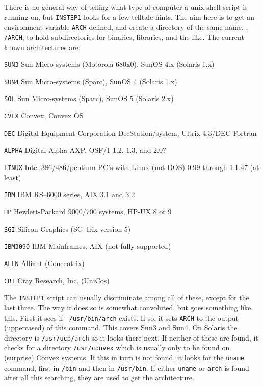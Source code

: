 \medskip{}

There is no general way of telling what type of computer a unix shell
script is running on, but {\tt INSTEP1} looks for a few telltale
hints.  The aim here is to get an environment variable {\tt ARCH}
defined, and create a directory of the same name, \ie, {\tt
\thisver/\dol ARCH}, to hold subdirectories for binaries, libraries, and
the like.  The current known architectures are:
\medskip %

{\parindent=2.5cm
\item{\tt SUN3\quad}    Sun Micro-systems (Motorola 680x0), SunOS 4.x
                        (Solaris 1.x)
\item{\tt SUN4\quad}    Sun Micro-systems (Sparc), SunOS 4 (Solaris 1.x)
\item{\tt SOL\quad}     Sun Micro-systems (Sparc), SunOS 5 (Solaris 2.x)
\item{\tt CVEX\quad}    Convex, Convex OS
\item{\tt DEC\quad}     Digital Equipment Corporation DecStation/system,
                        Ultrix 4.3/DEC Fortran
\item{\tt ALPHA\quad}   Digital Alpha AXP, OSF/1 1.2, 1.3, and 2.0?
\item{\tt LINUX\quad}   Intel 386/486/pentium PC's with Linux (not DOS) 0.99
                        through 1.1.47 (at least)
\item{\tt IBM\quad}     IBM RS--6000 series, AIX 3.1 and 3.2
\item{\tt HP\quad}      Hewlett-Packard 9000/700 systems, HP-UX 8 or 9
\item{\tt SGI\quad}     Silicon Graphics (SG--Irix version 5)
\item{\tt IBM3090\quad} IBM Mainframes, AIX (not fully supported)
\item{\tt ALLN\quad}    Alliant (Concentrix)
\item{\tt CRI\quad}     Cray Research, Inc. (UniCos)
}\medskip

\noindent The {\tt INSTEP1} script can usually discriminate among all
of these, except for the last three.  The way it does so is somewhat
convoluted, but goes something like this.  First it sees if {\tt
/usr/bin/arch} exists.  If so, it sets {\tt ARCH} to the output
(uppercased) of this command.  This covers Sun3 and Sun4.  On Solaris
the directory is {\tt /usr/ucb/arch} so it looks there next.  If neither
of these are found, it checks for a directory {\tt /usr/convex} which is
usually only to be found on (surprise) Convex systems.  If this in turn is
not found, it looks for the {\tt uname} command, first in {\tt /bin}
and then in {\tt /usr/bin}.  If either {\tt uname} or {\tt arch} is
found after all this searching, they are used to get the architecture.

